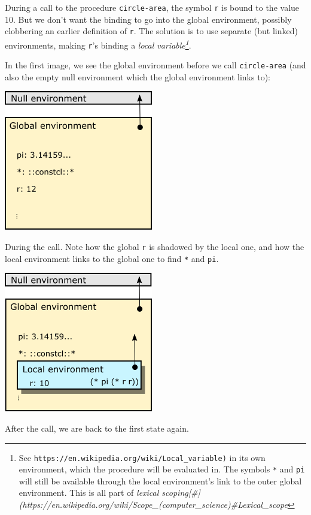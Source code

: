 \documentclass[twoside,9pt]{report}
\begin{document}
During a call to the procedure \texttt{circle-area}, the symbol \texttt{r} is bound to the value 10. But we don't want the binding to go into the global environment, possibly clobbering an earlier definition of \texttt{r}. The solution is to use separate (but linked) environments, making \texttt{r}'s binding a \emph{local variable\footnote{See \texttt{https://en.wikipedia.org/wiki/Local\_variable)} in its own environment, which the procedure will be evaluated in. The symbols \texttt{*} and \texttt{pi} will still be available through the local environment's link to the outer global environment. This is all part of \emph{lexical scoping[\#](https://en.wikipedia.org/wiki/Scope\_(computer\_science)\#Lexical\_scope}}}.


In the first image, we see the global environment before we call \texttt{circle-area} (and also the empty null environment which the global environment links to):


\includegraphics{images/env1.png}


During the call. Note how the global \texttt{r} is shadowed by the local one, and how the local environment links to the global one to find \texttt{*} and \texttt{pi}.


\includegraphics{images/env2.png}


After the call, we are back to the first state again.
\end{document}
